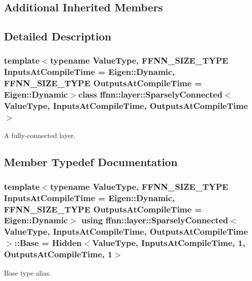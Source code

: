 \subsection*{Additional Inherited Members}


\subsection{Detailed Description}
\subsubsection*{template$<$typename Value\-Type, F\-F\-N\-N\-\_\-\-S\-I\-Z\-E\-\_\-\-T\-Y\-P\-E Inputs\-At\-Compile\-Time = Eigen\-::\-Dynamic, F\-F\-N\-N\-\_\-\-S\-I\-Z\-E\-\_\-\-T\-Y\-P\-E Outputs\-At\-Compile\-Time = Eigen\-::\-Dynamic$>$class ffnn\-::layer\-::\-Sparsely\-Connected$<$ Value\-Type, Inputs\-At\-Compile\-Time, Outputs\-At\-Compile\-Time $>$}

A fully-\/connected layer. 

\subsection{Member Typedef Documentation}
\hypertarget{classffnn_1_1layer_1_1_sparsely_connected_af35eb87098c81ea0eb0cd9b3b702a614}{
\subsubsection[{Base}]{\setlength{\rightskip}{0pt plus 5cm}template$<$typename Value\-Type, F\-F\-N\-N\-\_\-\-S\-I\-Z\-E\-\_\-\-T\-Y\-P\-E Inputs\-At\-Compile\-Time = Eigen\-::\-Dynamic, F\-F\-N\-N\-\_\-\-S\-I\-Z\-E\-\_\-\-T\-Y\-P\-E Outputs\-At\-Compile\-Time = Eigen\-::\-Dynamic$>$ using {\bf ffnn\-::layer\-::\-Sparsely\-Connected}$<$ Value\-Type, Inputs\-At\-Compile\-Time, Outputs\-At\-Compile\-Time $>$\-::{\bf Base} =  {\bf Hidden}$<$Value\-Type, Inputs\-At\-Compile\-Time, 1, Outputs\-At\-Compile\-Time, 1$>$}}\label{classffnn_1_1layer_1_1_sparsely_connected_af35eb87098c81ea0eb0cd9b3b702a614}


Base type alias. 

